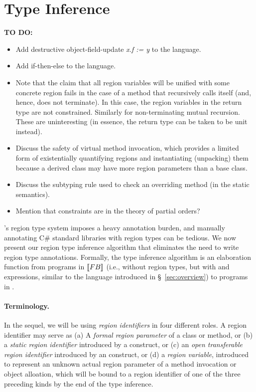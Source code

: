 \section{Type Inference}
\label{sec:type-inference}

\textbf{TO DO:}
\begin{itemize}
\item Add destructive object-field-update \emph{x.f := y} to the language.
\item Add if-then-else to the language.
\item Note that the claim that all region variables will be unified with some concrete
region fails in the case of a method that recursively calls itself (and, hence, does not
terminate). In this case, the region variables in the return type are not constrained.
Similarly for non-terminating mutual recursion. These are uninteresting (in essence, the
return type can be taken to be unit instead).
\item Discuss the safety of virtual method invocation, which provides a limited form
of existentially quantifying regions and instantiating (unpacking) them because a
derived class may have more region parameters than a base class.
\item Discuss the subtyping rule used to check an overriding method (in the static
semantics).
\item Mention that constraints are in the theory of partial orders?
\end{itemize}

\name's region type system imposes a heavy annotation burden, and
manually annotating C\# standard libraries with region types
can be tedious. We now present our region type inference algorithm
that eliminates the need to write region type annotations.
Formally, the type inference
algorithm is an elaboration function from programs in $\llbracket {\sc FB} \rrbracket$
(i.e., \FB without region types, but with  and 
expressions, similar to the language introduced in
\S~\ref{sec:overview}) to programs in \FB.

\paragraph{Terminology.}
In the sequel, we will be using \emph{region identifiers} in four different roles.
A region identifier may serve as
(a) A \emph{formal region parameter} of a class or method, or
(b) a \emph{static region identifier} introduced by a  construct, or
(c) an  \emph{open transferable region identifier} introduced by an  construct, or
(d) a \emph{region variable}, introduced to represent an unknown actual region parameter
of a method invocation or object alloation,
which will be bound to a region identifier of one of the three
preceding kinds by the end of the type inference.

